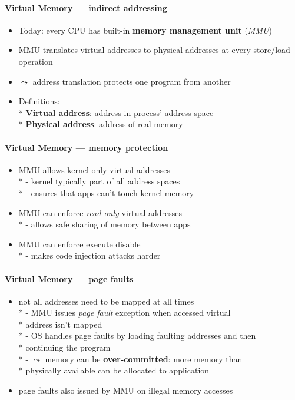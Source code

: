 \paragraph{Virtual Memory --- indirect addressing}
\begin{itemize}
	\item Today: every CPU has built-in \textbf{memory management unit} (\emph{MMU})
	\item MMU translates virtual addresses to physical addresses at every store/load operation
	\item \( \leadsto \) address translation protects one program from another
	\item Definitions:
		\\*
		\textbf{Virtual address}: address in process' address space
		\\*
		\textbf{Physical address}: address of real memory
\end{itemize}

\paragraph{Virtual Memory --- memory protection}
\begin{itemize}
	\item MMU allows kernel-only virtual addresses
		\\*
		- kernel typically part of all address spaces
		\\*
		- ensures that apps can't touch kernel memory
	\item MMU can enforce \emph{read-only} virtual addresses
		\\*
		- allows safe sharing of memory between apps
	\item MMU can enforce execute disable
		\\*
		- makes code injection attacks harder
\end{itemize}

\paragraph{Virtual Memory --- page faults}
\begin{itemize}
	\item not all addresses need to be mapped at all times
		\\*
		- MMU issues \emph{page fault} exception when accessed virtual \\* \phantom{-} address isn't mapped
		\\*
		- OS handles page faults by loading faulting addresses and then \\* \phantom{-} continuing the program
		\\*
		- \( \leadsto \) memory can be \textbf{over-committed}: more memory than \\* \phantom{-} physically available can be allocated to application
	\item page faults also issued by MMU on illegal memory accesses
\end{itemize}

